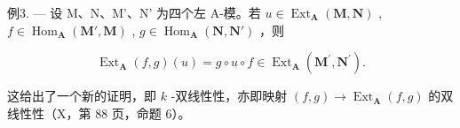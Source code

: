 例3. — 设 M、N、M'、N' 为四个左 A-模。若 \(u \in \operatorname{Ext}_{\mathbf{A}}(\mathbf{M}, \mathbf{N})\) , \(f \in \operatorname{Hom}_{\mathbf{A}}(\mathbf{M}', \mathbf{M})\) , \(g \in \operatorname{Hom}_{\mathbf{A}}(\mathbf{N}, \mathbf{N}')\) ，则

\[
\operatorname{Ext} _ {\mathbf {A}} (f, g) (u) = g \circ u \circ f \in \operatorname{Ext} _ {\mathbf {A}} (\mathbf {M} ^ {\prime}, \mathbf {N} ^ {\prime}).\tag{3}
\]

这给出了一个新的证明，即 \(k\) -双线性性，亦即映射 \((f, g) \to \operatorname{Ext}_{\mathbf{A}}(f, g)\) 的双线性性（X，第 88 页，命题 6）。

